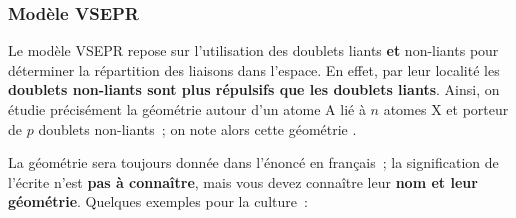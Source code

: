 \documentclass[../main/main.tex]{subfiles}
\begin{document}
\subsubsection{Modèle VSEPR}
Le modèle VSEPR repose sur l'utilisation des doublets liants \textbf{et}
non-liants pour déterminer la répartition des liaisons dans l'espace. En effet,
par leur localité les \textbf{doublets non-liants sont plus répulsifs que les
doublets liants}. Ainsi, on étudie précisément la géométrie autour d'un atome A
lié à $n$ atomes X et porteur de $p$ doublets non-liants~; on note alors cette
géométrie .

La géométrie sera toujours donnée dans l'énoncé en français~; la signification
de l'écrite  n'est \textbf{pas à connaître}, mais vous devez
connaître leur \textbf{nom et leur géométrie}. Quelques exemples pour la
culture~:
\end{document}
